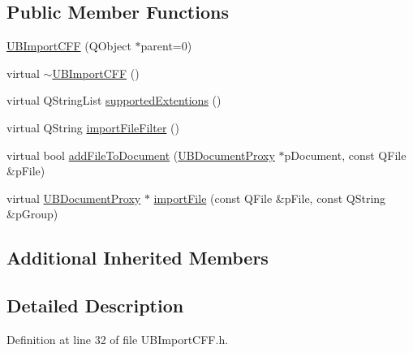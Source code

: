 \subsection*{Public Member Functions}
\begin{DoxyCompactItemize}
\item 
\hyperlink{class_u_b_import_c_f_f_af5851098493b9f9bfac250af89c3299a}{U\-B\-Import\-C\-F\-F} (Q\-Object $\ast$parent=0)
\item 
virtual \hyperlink{class_u_b_import_c_f_f_ac9b7acb2e16aad7e95b2ef2e7f7eef90}{$\sim$\-U\-B\-Import\-C\-F\-F} ()
\item 
virtual Q\-String\-List \hyperlink{class_u_b_import_c_f_f_a516545307bebac521aecee513954645d}{supported\-Extentions} ()
\item 
virtual Q\-String \hyperlink{class_u_b_import_c_f_f_a38a9ff45778b279a815013901af773ef}{import\-File\-Filter} ()
\item 
virtual bool \hyperlink{class_u_b_import_c_f_f_a82cf29b094bc9fb0378d4a3b179bfb29}{add\-File\-To\-Document} (\hyperlink{class_u_b_document_proxy}{U\-B\-Document\-Proxy} $\ast$p\-Document, const Q\-File \&p\-File)
\item 
virtual \hyperlink{class_u_b_document_proxy}{U\-B\-Document\-Proxy} $\ast$ \hyperlink{class_u_b_import_c_f_f_a9130014d79eadf931ffa89af9d656a12}{import\-File} (const Q\-File \&p\-File, const Q\-String \&p\-Group)
\end{DoxyCompactItemize}
\subsection*{Additional Inherited Members}


\subsection{Detailed Description}


Definition at line 32 of file U\-B\-Import\-C\-F\-F.\-h.



